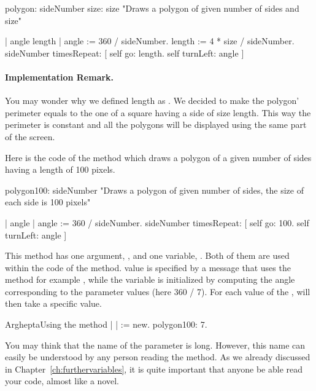 \begin{method}\label{mth:fixedSizePolygon}
polygon: sideNumber size: size
    "Draws a polygon of given number of sides and size"

    | angle length |
    angle := 360 / sideNumber.
    length := 4 * size / sideNumber.
    sideNumber timesRepeat: 
                               [ self go: length.
                               self turnLeft: angle ]
\end{method}



\paragraph{Implementation Remark.} You may wonder why we defined length as . We decided to make the polygon' perimeter equals to the one of a
square having a side of size length. This way the perimeter is constant and all the polygons will be displayed using the same part of the screen. 

Here is the code of the method  which draws a polygon of a given number of sides having a length of 100 pixels.

\begin{method}\label{mth:regularPolygon}
polygon100: sideNumber
    "Draws a polygon of given number of sides, the size of each
    side is 100 pixels"

    | angle |
    angle := 360 / sideNumber.
    sideNumber timesRepeat: 
                               [ self go: 100.
                               self turnLeft: angle ]
\end{method}

This method has one argument, , and one variable, . Both of them are used within the code of the method.  value is specified by a message that uses the method for example , while the variable  is initialized by computing the angle corresponding to the parameter values (here 360 / 7). For each value of the ,  will then take a specific value.

\begin{scriptfig}{Arghepta}{Using the method }\label{src:heptagon}
| \caro |
\caro := \Turtle new.
\caro polygon100: 7.
\end{scriptfig}

You may think that the name of the parameter  is long. However, this name can easily be understood by any person reading the method. As we already discussed in Chapter~\ref{ch:furthervariables}, it is quite important that anyone be able read your code, almost like a novel. 



